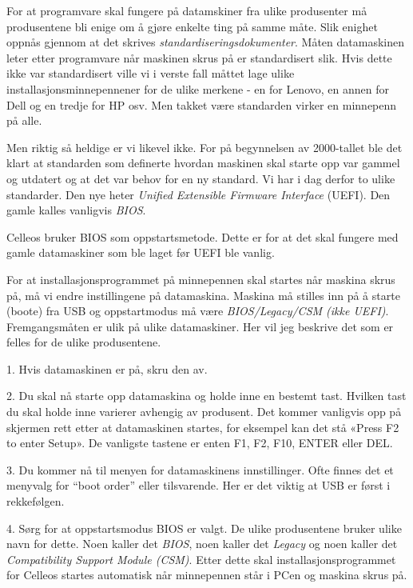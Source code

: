For at programvare skal fungere p\aa{} datamskiner fra ulike produsenter m\aa{} produsentene bli enige om  \aa{} gj\o re enkelte ting p\aa{} samme m\aa te. Slik enighet oppn\aa s gjennom at det skrives {\it standardiseringsdokumenter}. M\aa ten datamaskinen leter etter programvare n\aa r maskinen skrus p\aa{} er standardisert slik. Hvis dette ikke var standardisert ville vi i verste fall m\aa ttet lage ulike installasjonsminnepennener for de ulike merkene - en for Lenovo, en annen for Dell og  en tredje for HP osv. Men takket v\ae re standarden virker en minnepenn p\aa{} alle.

Men riktig s\aa{} heldige er vi likevel ikke. For p\aa{} begynnelsen av 2000-tallet ble det klart at standarden som definerte hvordan maskinen skal starte opp var gammel og utdatert og at det var behov for en ny standard. Vi har i dag derfor to ulike standarder. Den nye heter {\it Unified Extensible Firmware Interface} (UEFI). Den gamle kalles vanligvis {\it BIOS}. 

Celleos bruker BIOS som oppstartsmetode. Dette er for at det skal fungere med gamle datamaskiner som ble laget f\o r UEFI ble vanlig. 


For at installasjonsprogrammet p\aa{} minnepennen skal startes n\aa r maskina skrus p\aa , m\aa{} vi endre instillingene p\aa{} datamaskina. Maskina m\aa{} stilles inn p\aa{} \aa{} starte (boote) fra USB og oppstartmodus m\aa{} v\ae re {\it BIOS/Legacy/CSM (ikke UEFI)}. Fremgangsm\aa ten er ulik p\aa{} ulike datamaskiner. Her vil jeg beskrive det som er felles for de ulike produsentene. 
\item{1.} Hvis datamaskinen er p\aa, skru den av.
\item{2.} Du skal n\aa{} starte opp datamaskina og holde inne en bestemt tast. Hvilken tast du skal holde inne varierer avhengig av produsent. Det kommer vanligvis opp p\aa{} skjermen rett etter at datamaskinen startes, for eksempel kan det st\aa{} «Press F2 to enter Setup». De vanligste tastene er enten F1, F2, F10, ENTER eller DEL.
\item{3.} Du kommer n\aa{} til menyen for datamaskinens innstillinger. Ofte finnes det et menyvalg for ``boot order'' eller tilsvarende. Her er det viktig at USB er f\o rst i rekkef\o lgen.
\item{4.} S\o rg for at oppstartsmodus BIOS er valgt. De ulike produsentene bruker ulike navn for dette. Noen kaller det {\it BIOS}, noen kaller det {\it Legacy} og noen kaller det {\it Compatibility Support Module (CSM)}. 
Etter dette skal installasjonsprogrammet for Celleos startes automatisk n\aa r minnepennen st\aa r i PCen og maskina skrus p\aa.


